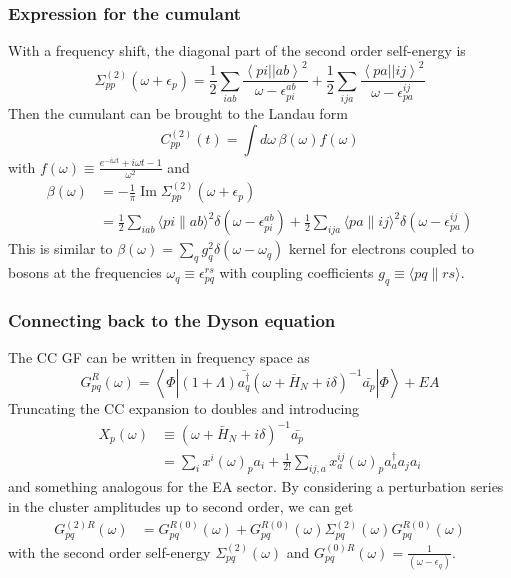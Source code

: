\begin{frame}
    \frametitle{Expression for the cumulant}
With a frequency shift, the diagonal part of the second order self-energy is
\begin{equation}
    \Sigma_{pp}^{(2)}(\omega+\epsilon_p) =
\frac{1}{2} \sum_{iab}
\frac{\left< pi \left| \right| ab \right>^2}
{\omega-\epsilon_{pi}^{ab}} + \frac{1}{2} \sum_{ija}
\frac{\left< pa \left| \right| ij \right>^2}
{\omega-\epsilon_{pa}^{ij}}
\end{equation}
Then the cumulant can be brought to the Landau form
\begin{equation}
    C_{pp}^{(2)}(t) = \int d\omega\, \beta(\omega) f(\omega)
\end{equation}
with $f(\omega) \equiv \frac{e^{-i \omega t}+i \omega t-1}{\omega^2} $ and
\begin{align}
    \beta(\omega) &= -\frac{1}{\pi} \operatorname{Im} \Sigma_{pp}^{(2)}\left(\omega+\epsilon_p\right) 
\label{eq:beta_def}\\
&=\frac{1}{2} \sum_{i a b}\langle p i \| a b\rangle^2 \delta\left(\omega-\epsilon_{p i}^{a b}\right)+\frac{1}{2} \sum_{i j a}\langle p a \| i j\rangle^2 \delta\left(\omega-\epsilon_{p a}^{i j}\right) \label{eq:beta_2nd}
\end{align}
This is similar to $\beta(\omega)=\sum_q g_q^2 \delta(\omega-\omega_q)$ kernel for electrons coupled to
bosons at the frequencies $\omega_q\equiv \epsilon_{pq}^{rs}$
with coupling coefficients $g_q \equiv \langle p q \| r s\rangle$.
\end{frame}
\begin{frame}
    \frametitle{Connecting back to the Dyson equation}
The CC GF can be written in frequency space as
\begin{equation}
    G_{pq}^R (\omega) = \left\langle \Phi \left| (1+\Lambda) \bar{a^{\dagger}_q}(\omega + \bar{H}_N + i\delta)^{-1} \bar{a_p} \right| \Phi \right\rangle + EA
\end{equation}
Truncating the CC expansion to doubles and introducing
\begin{align}
    X_p(\omega) & \equiv (\omega + \bar{H}_N + i\delta)^{-1} \bar{a_p} \\
& =\sum_i x^i(\omega)_p a_i+\frac{1}{2!} \sum_{ij, a} x_a^{ij}(\omega)_p a_a^{\dagger} a_j a_i
\end{align}
and something analogous for the EA sector. By considering a perturbation series in the cluster amplitudes up to second order, we can get
\begin{align}
    G_{pq}^{(2)R}(\omega)
&= G_{pq}^{R(0)} (\omega) + G_{pq}^{R(0)} (\omega) \Sigma_{pq}^{(2)}(\omega) G_{pq}^{R(0)} (\omega)
\end{align}
with the second order self-energy $\Sigma_{pq}^{(2)}(\omega)$ and $G_{pq}^{(0) R}(\omega)= \frac{1}{(\omega-\epsilon_q)}$.
\end{frame}

